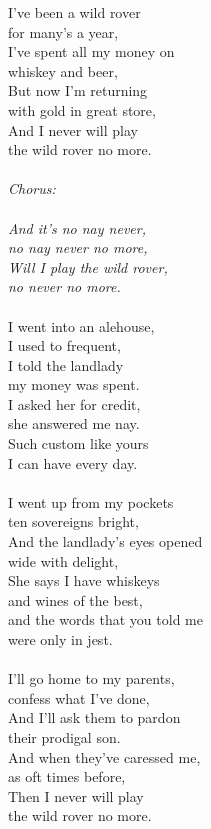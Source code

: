\documentclass[a5paper]{article}
\begin{document}
I've been a wild rover \\
for many's a year,\\
I've spent all my money on \\
whiskey and beer,\\
But now I'm returning \\
with gold in great store,\\
And I never will play \\
the wild rover no more.\\
\\
\textit{Chorus:\\
\\
And it's no nay never, \\
no nay never no more,\\
Will I play the wild rover,\\
no never no more.\\}
\\
I went into an alehouse, \\
I used to frequent,\\
I told the landlady\\
my money was spent.\\
I asked her for credit, \\
she answered me nay.\\
Such custom like yours \\
I can have every day.\\
\\
I went up from my pockets\\
ten sovereigns bright,\\
And the landlady's eyes opened \\
wide with delight,\\
She says I have whiskeys \\
and wines of the best,\\
and the words that you told me\\
 were only in jest.\\
\\
I'll go home to my parents, \\
confess what I've done,\\
And I'll ask them to pardon \\
their prodigal son.\\
And when they've caressed me, \\
as oft times before,\\
Then I never will play \\
the wild rover no more. 
\end{document}
